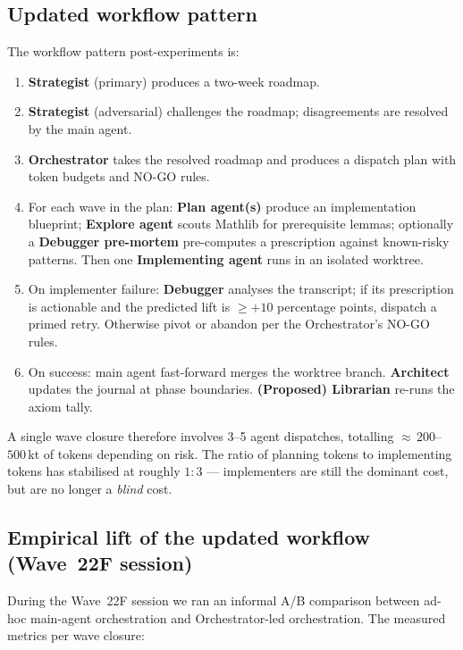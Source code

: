 \documentclass[11pt,a4paper]{article}
\theoremstyle{plain}
\theoremstyle{definition}
\begin{document}
\subsection{Updated workflow pattern}

The workflow pattern post-experiments is:

\begin{enumerate}[leftmargin=1.3em]
  \item \textbf{Strategist} (primary) produces a two-week roadmap.
  \item \textbf{Strategist} (adversarial) challenges the roadmap;
        disagreements are resolved by the main agent.
  \item \textbf{Orchestrator} takes the resolved roadmap and produces
        a dispatch plan with token budgets and NO-GO rules.
  \item For each wave in the plan: \textbf{Plan agent(s)} produce an
        implementation blueprint; \textbf{Explore agent} scouts
        Mathlib for prerequisite lemmas; optionally a \textbf{Debugger
        pre-mortem} pre-computes a prescription against known-risky
        patterns. Then one \textbf{Implementing agent} runs in an
        isolated worktree.
  \item On implementer failure: \textbf{Debugger} analyses the
        transcript; if its prescription is actionable and the
        predicted lift is $\geq +10$ percentage points, dispatch a
        primed retry. Otherwise pivot or abandon per the Orchestrator's
        NO-GO rules.
  \item On success: main agent fast-forward merges the worktree
        branch. \textbf{Architect} updates the journal at phase
        boundaries. \textbf{(Proposed) Librarian} re-runs the axiom
        tally.
\end{enumerate}

A single wave closure therefore involves 3--5 agent dispatches,
totalling ${\approx}\,200$--$500$\,kt of tokens depending on risk.
The ratio of planning tokens to implementing tokens has stabilised at
roughly $1{:}3$ --- implementers are still the dominant cost, but
are no longer a \emph{blind} cost.

\subsection{Empirical lift of the updated workflow (Wave~22F session)}

During the Wave~22F session we ran an informal A/B comparison between
ad-hoc main-agent orchestration and Orchestrator-led orchestration.
The measured metrics per wave closure:
\end{document}
